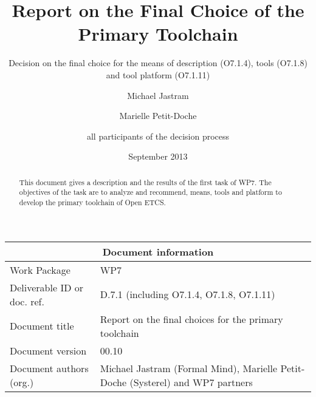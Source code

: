 \documentclass{template/openetcs_report}
\begin{document}
\frontmatter
{}




\title{Report on the Final Choice of the Primary Toolchain }

\subtitle{ Decision on the final choice for the means of description (O7.1.4), tools (O7.1.8) and tool platform (O7.1.11)}

\date{September 2013}


\author{Michael Jastram}

\author{Marielle Petit-Doche}

\author{all participants of the decision process}

 

\begin{abstract}
This document gives  a description and the results of the first task of WP7. The objectives of the task are to analyze and recommend, means, tools and platform to develop the primary toolchain of Open ETCS.

\end{abstract}

\maketitle
\tableofcontents
\listoffiguresandtables
\newpage


\begin{tabular}{|p{4.4cm}|p{8.7cm}|}
\hline
\multicolumn{2}{|c|}{Document information} \\
\hline
Work Package &  WP7  \\
Deliverable ID or doc. ref. & D.7.1 (including O7.1.4, O7.1.8, O7.1.11) \\
\hline
Document title & Report on the final choices for the primary toolchain \\
Document version & 00.10 \\
Document authors (org.)  & Michael Jastram (Formal Mind), Marielle Petit-Doche (Systerel) and WP7 partners  \\
\hline
\end{tabular}
\end{document}
